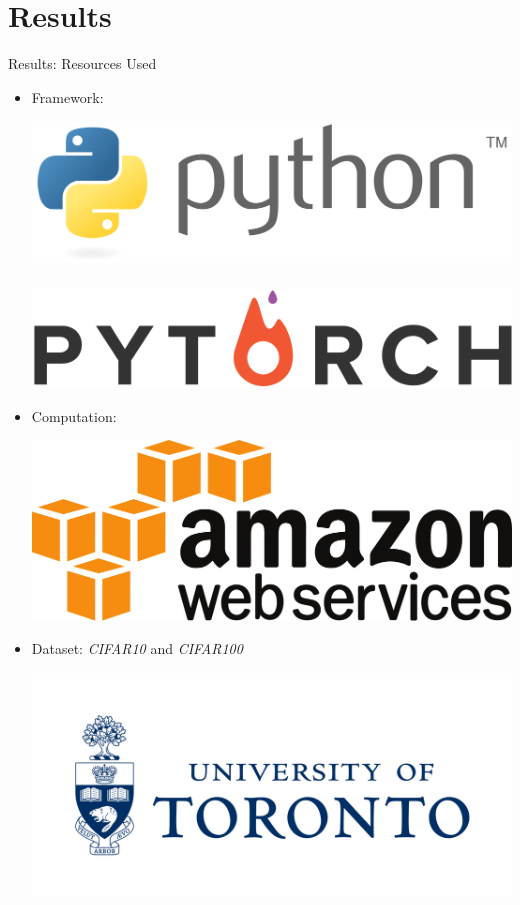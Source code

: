 \documentclass[10pt]{beamer}
\begin{document}
  \section{Results}
  \endgroup

  \begin{frame}{Results: Resources Used}

  \begin{itemize}
    \item Framework: \\
      \begin{center}
        \includegraphics[width=0.3\linewidth]{./img/python_logo.png}\ \includegraphics[width=0.6\linewidth]{./img/pytorch_logo.png}
      \end{center}
    \item Computation: \\
      \begin{center}
        \includegraphics[width=0.50\linewidth]{./img/AWS_logo.png}
      \end{center}
    \item Dataset: \textit{CIFAR10} and \textit{CIFAR100}\\
    \begin{center}
      \includegraphics[width=0.6\linewidth]{./img/UoT_logo.png}
    \end{center}
  \end{itemize}

  \end{frame}
\end{document}
